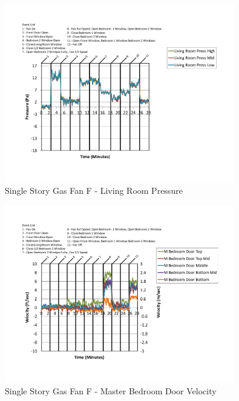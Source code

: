 \documentclass{article}
\begin{document}
\begin{appendices}
	\begin{figure}[H]
		\centering
		\includegraphics[height=3.05in,trim=0.67in 1.1in 0.67in 0.8in,clip=true]{0_Images/Results_Charts/ColdFlow/Single_Story/Gas/F/Living_Room_Pressure.pdf}
		\caption{Single Story Gas Fan F - Living Room Pressure}
	\end{figure}
 

	\begin{figure}[H]
		\centering
		\includegraphics[height=3.05in,trim=0.67in 1.1in 0.67in 0.8in,clip=true]{0_Images/Results_Charts/ColdFlow/Single_Story/Gas/F/Master_Bedroom_Door_Velocity.pdf}
		\caption{Single Story Gas Fan F - Master Bedroom Door Velocity}
	\end{figure}
 
	\clearpage


\end{appendices}
\end{document}
